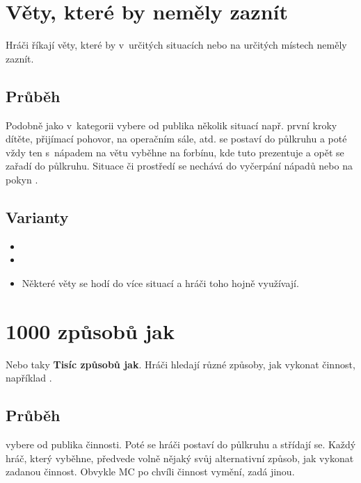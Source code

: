  
 
 
 
 
 
\needspace{5cm} \section{Věty, které by neměly zaznít} \label{věty, které by neměly zaznít}  
 
 
Hráči říkají věty, které by v~určitých situacích nebo na určitých místech neměly zaznít. 
 
 
\subsection{ Průběh } Podobně jako v~kategorii  vybere  od publika několik situací např. první kroky dítěte, přijímací pohovor, na operačním sále, atd.  se postaví do půlkruhu a poté vždy ten s~nápadem na větu vyběhne na forbínu, kde tuto  prezentuje a opět se zařadí do půlkruhu. Situace či prostředí se nechává do vyčerpání nápadů nebo na pokyn . 
 
\subsection{ Varianty } \begin{itemize}
\item  {}
\item  {}
\item  Některé věty se hodí do více situací a hráči toho hojně využívají.
\end{itemize}
 
 
 
 
 
\needspace{5cm} \section{1000 způsobů jak} \label{1000 způsobů jak}  
 
 
Nebo taky \textbf{Tisíc způsobů jak}. Hráči hledají různé způsoby, jak vykonat činnost, například . 
 
 
\subsection{Průběh}  
 vybere od publika činnosti. Poté se hráči postaví do půlkruhu a střídají se. Každý hráč, který vyběhne, předvede volně nějaký svůj alternativní způsob, jak vykonat zadanou činnost. Obvykle MC po chvíli činnost vymění, zadá jinou. 
 
